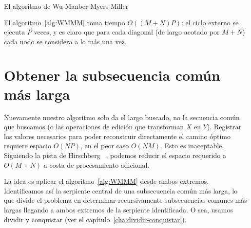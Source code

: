   \begin{algorithm}[htbp]
    \DontPrintSemicolon\Indp

    \;
    \caption{El algoritmo de Wu-Manber-Myers-Miller}
    \label{alg:WMMM}
  \end{algorithm}
  El algoritmo~\ref{alg:WMMM} toma tiempo \(O((M + N) P)\):
  el ciclo externo se ejecuta \(P\) veces,
  y es claro que para cada diagonal
  (de largo acotado por \(M + N\))
  cada nodo se considera a lo más una vez.

\section{Obtener la subsecuencia común más larga}
\label{sec:LCS-lineal}

  Nuevamente nuestro algoritmo solo da el largo buscado,
  no la secuencia común que buscamos
  (o las operaciones de edición que transforman \(X\) en \(Y\)).
  Registrar los valores necesarios
  para poder reconstruir directamente el camino óptimo
  requiere espacio \(O(N P)\),
  en el peor caso \(O(N M)\).
  Esto es inaceptable.
  Siguiendo la pista de Hirschberg~%
    \cite{hirschberg75:_linear_space_algor_comput_maxim_common_subseq},
  podemos reducir el espacio requerido a \(O(M + N)\)
  a costa de procesamiento adicional.

  La idea es aplicar el algoritmo~\ref{alg:WMMM}
  desde ambos extremos.
  Identificamos así la serpiente central de una subsecuencia común más larga,
  lo que divide el problema
  en determinar recursivamente subsecuencias comunes más largas
  llegando a ambos extremos de la serpiente identificada.
  O sea,
  usamos dividir y conquistar
  (ver el capítulo~\ref{cha:dividir-conquistar}).

